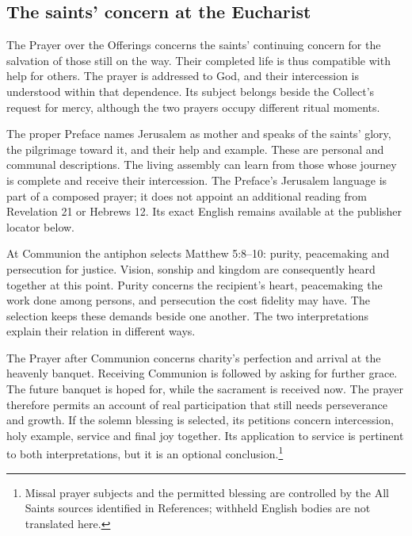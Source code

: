 \subsection{The saints' concern at the Eucharist}
The Prayer over the Offerings concerns the saints' continuing concern for the salvation of those still on the way. Their completed life is thus compatible with help for others. The prayer is addressed to God, and their intercession is understood within that dependence. Its subject belongs beside the Collect's request for mercy, although the two prayers occupy different ritual moments.

The proper Preface names Jerusalem as mother and speaks of the saints' glory, the pilgrimage toward it, and their help and example. These are personal and communal descriptions. The living assembly can learn from those whose journey is complete and receive their intercession. The Preface's Jerusalem language is part of a composed prayer; it does not appoint an additional reading from Revelation 21 or Hebrews 12. Its exact English remains available at the publisher locator below.

At Communion the antiphon selects Matthew 5:8--10: purity, peacemaking and persecution for justice. Vision, sonship and kingdom are consequently heard together at this point. Purity concerns the recipient's heart, peacemaking the work done among persons, and persecution the cost fidelity may have. The selection keeps these demands beside one another. The two interpretations explain their relation in different ways.

The Prayer after Communion concerns charity's perfection and arrival at the heavenly banquet. Receiving Communion is followed by asking for further grace. The future banquet is hoped for, while the sacrament is received now. The prayer therefore permits an account of real participation that still needs perseverance and growth. If the solemn blessing is selected, its petitions concern intercession, holy example, service and final joy together. Its application to service is pertinent to both interpretations, but it is an optional conclusion.\footnote{Missal prayer subjects and the permitted blessing are controlled by the All Saints sources identified in References; withheld English bodies are not translated here.}
